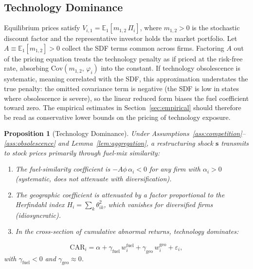 \documentclass[12pt,a4paper]{article}
\newtheorem{proposition}{Proposition}
\newcommand{\E}{\mathbb{E}}
\begin{document}
\subsection{Technology Dominance}\label{sec:predictions}

Equilibrium prices satisfy $V_{i,1} = \E_1[m_{1,2}\, \Pi_i]$, where $m_{1,2} > 0$ is the stochastic discount factor and the representative investor holds the market portfolio. Let $A \equiv \E_1[m_{1,2}] > 0$ collect the SDF terms common across firms.\label{def:equilibrium} Factoring $A$ out of the pricing equation treats the technology penalty as if priced at the risk-free rate, absorbing $\mathrm{Cov}(m_{1,2},\,\varphi_i)$ into the constant. If technology obsolescence is systematic, meaning correlated with the SDF, this approximation understates the true penalty: the omitted covariance term is negative (the SDF is low in states where obsolescence is severe), so the linear reduced form biases the fuel coefficient toward zero. The empirical estimates in Section~\ref{sec:empirical} should therefore be read as conservative lower bounds on the pricing of technology exposure.

\begin{proposition}[Technology Dominance]\label{prop:tech_dominance}
    Under Assumptions~\ref{ass:competition}--\ref{ass:obsolescence} and Lemma~\ref{lem:aggregation}, a restructuring shock $\mathbf{s}$ transmits to stock prices primarily through fuel-mix similarity:
    \begin{enumerate}
        \item[(i)] The fuel-similarity coefficient is $-A\phi\,\alpha_i < 0$ for any firm with $\alpha_i > 0$ (systematic, does not attenuate with diversification).
        \item[(ii)] The geographic coefficient is attenuated by a factor proportional to the Herfindahl index $H_i = \sum_k \theta_{ik}^2$, which vanishes for diversified firms (idiosyncratic).
        \item[(iii)] In the cross-section of cumulative abnormal returns, technology dominates:
    \end{enumerate}
    \begin{equation}\label{eq:reduced_form}
        \mathrm{CAR}_i = \alpha + \gamma_{\mathrm{fuel}}\, w^{\mathrm{fuel}}_i + \gamma_{\mathrm{geo}}\, w^{\mathrm{geo}}_i + \varepsilon_i,
    \end{equation}
    with $\gamma_{\mathrm{fuel}} < 0$ and $\gamma_{\mathrm{geo}} \approx 0$.
\end{proposition}
\end{document}
